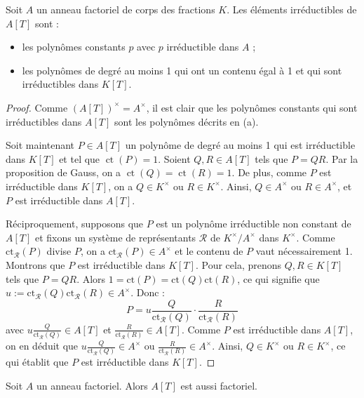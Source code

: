 \documentclass[]{report}
\begin{document}
\begin{tm}{}{}
    Soit $A$ un anneau factoriel de corps des fractions $K$. Les éléments irréductibles de $A[T]$ sont :
    \begin{itemize}
        \item[(a)] les polynômes constants $p$ avec $p$ irréductible dans $A$ ;
        \item[(b)] les polynômes de degré au moins 1 qui ont un contenu égal à 1 et qui sont irréductibles dans $K[T]$.
    \end{itemize}
\end{tm}

\begin{proof}
    Comme $(A[T])^{\times} = A^{\times}$, il est clair que les polynômes constants qui sont irréductibles dans $A[T]$ sont les polynômes décrits en (a).

    Soit maintenant $P \in A[T]$ un polynôme de degré au moins 1 qui est irréductible dans $K[T]$ et tel que $\operatorname{ct}(P) = 1$. Soient $Q, R \in A[T]$ tels que $P = QR$. Par la proposition de Gauss, on a $\operatorname{ct}(Q) = \operatorname{ct}(R) = 1$. De plus, comme $P$ est irréductible dans $K[T]$, on a $Q \in K^{\times}$ ou $R \in K^{\times}$. Ainsi, $Q \in A^{\times}$ ou $R \in A^{\times}$, et $P$ est irréductible dans $A[T]$.

    Réciproquement, supposons que $P$ est un polynôme irréductible non constant de $A[T]$ et fixons un système de représentants $\mathcal{R}$ de $K^{\times}/A^{\times}$ dans $K^{\times}$. Comme $\mathrm{ct}_{\mathcal{R}}(P)$ divise $P$, on a $\mathrm{ct}_{\mathcal{R}}(P) \in A^{\times}$ et le contenu de $P$ vaut nécessairement 1. Montrons que $P$ est irréductible dans $K[T]$. Pour cela, prenons $Q, R \in K[T]$ tels que $P = QR$. Alors $1 = \mathrm{ct}(P) = \mathrm{ct}(Q)\mathrm{ct}(R)$, ce qui signifie que $u := \mathrm{ct}_{\mathcal{R}}(Q)\mathrm{ct}_{\mathcal{R}}(R) \in A^{\times}$. Donc :
    \[P = u \frac{Q}{\mathrm{ct}_{\mathcal{R}}(Q)} \cdot \frac{R}{\mathrm{ct}_{\mathcal{R}}(R)}\]
    avec $u \frac{Q}{\mathrm{ct}_{\mathcal{R}}(Q)} \in A[T]$ et $\frac{R}{\mathrm{ct}_{\mathcal{R}}(R)} \in A[T]$. Comme $P$ est irréductible dans $A[T]$, on en déduit que $u \frac{Q}{\mathrm{ct}_{\mathcal{R}}(Q)} \in A^{\times}$ ou $\frac{R}{\mathrm{ct}_{\mathcal{R}}(R)} \in A^{\times}$. Ainsi, $Q \in K^{\times}$ ou $R \in K^{\times}$, ce qui établit que $P$ est irréductible dans $K[T]$.
\end{proof}

\begin{tm}{}{}
    Soit $A$ un anneau factoriel. Alors $A[T]$ est aussi factoriel.
\end{tm}
\end{document}
